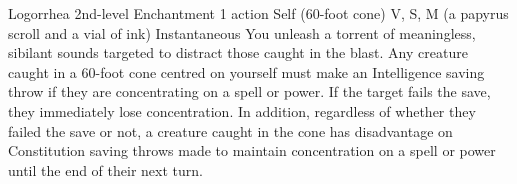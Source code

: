 \DndSpellHeader%
    {Logorrhea\label{spl:logorrhea}}
    {2nd-level Enchantment}
    {1 action}
    {Self (60-foot cone)}
    {V, S, M (a papyrus scroll and a vial of ink)}
    {Instantaneous}
You unleash a torrent of meaningless, sibilant sounds targeted
to distract those caught in the blast.
Any creature caught in a 60-foot cone centred on yourself must
make an Intelligence saving throw if they are concentrating on
a spell or power. If the target fails the save,
they immediately lose concentration. In addition,
regardless of whether they failed the save or not, a creature
caught in the cone has disadvantage on
Constitution saving throws made to maintain concentration on
a spell or power until the end of their next turn. 

